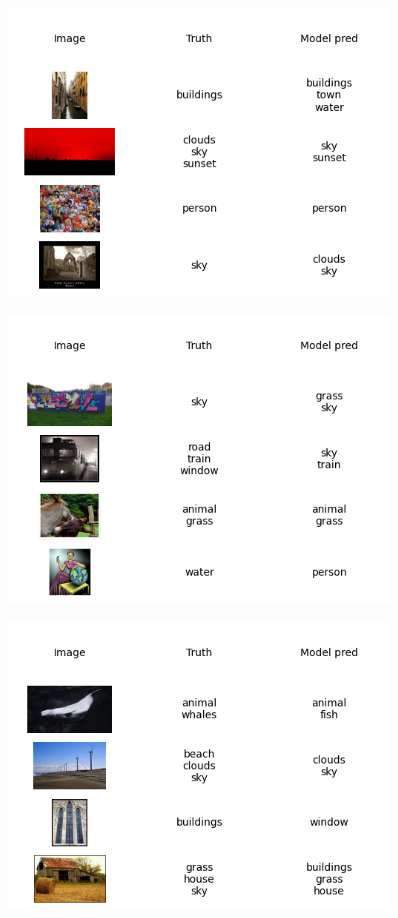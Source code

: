 \documentclass{udstu}
\begin{document}
\begin{figure}[!ht]
	\centering
	\includegraphics[width=0.9\textwidth]{PNG/showcase-300}
	\caption{}
\end{figure}

\begin{figure}[!ht]
	\centering
	\includegraphics[width=0.9\textwidth]{PNG/showcase-325}
	\caption{}
\end{figure}

\begin{figure}[!ht]
	\centering
	\includegraphics[width=0.9\textwidth]{PNG/showcase-350}
	\caption{}
\end{figure}
\end{document}
